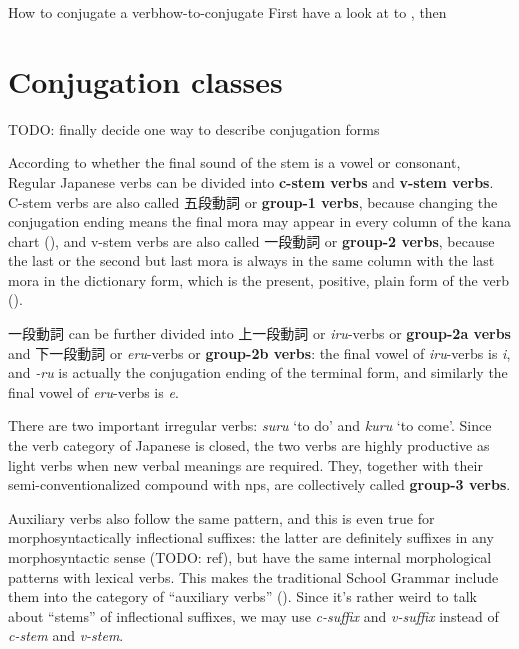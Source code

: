 \documentclass[UTF8, a4paper, oneside, scheme=plain]{ctexrep}
\newcommand*{\concept}[1]{\textbf{#1}}
\newcommand*{\term}[1]{\emph{#1}}
\newcommand{\corpus}[1]{\emph{#1}}
\newcommand{\translate}[1]{`#1'}
\begin{document}
\begin{learnbox}{How to conjugate a verb}{how-to-conjugate}
    First have a look at  to ,
    then 
\end{learnbox}

\section{Conjugation classes}\label{sec:conjugation-class}

TODO: finally decide one way to describe conjugation forms

According to whether the final sound of the stem is a vowel or consonant,
Regular Japanese verbs can be divided into \concept{c-stem verbs} and \concept{v-stem verbs}.
C-stem verbs are also called 五段動詞 or \concept{group-1 verbs},
because changing the conjugation ending means 
the final mora may appear in every column of the kana chart (), 
and v-stem verbs are also called 一段動詞 or \concept{group-2 verbs},
because the last or the second but last mora is always in the same column 
with the last mora in the dictionary form,
which is the present, positive, plain form of the verb ().

一段動詞 can be further divided into 上一段動詞 or \corpus{iru}-verbs or \concept{group-2a verbs} 
and 下一段動詞 or \corpus{eru}-verbs or \concept{group-2b verbs}:
the final vowel of \corpus{iru}-verbs is \corpus{i},
and \corpus{-ru} is actually the conjugation ending of the terminal form,
and similarly the final vowel of \corpus{eru}-verbs is \corpus{e}.

There are two important irregular verbs: \corpus{suru} \translate{to do} 
and \corpus{kuru} \translate{to come}.
Since the verb category of Japanese is closed,
the two verbs are highly productive as light verbs when new verbal meanings are required.
They, together with their semi-conventionalized compound with \ac{np}s,
are collectively called \concept{group-3 verbs}.

Auxiliary verbs also follow the same pattern,
and this is even true for morphosyntactically inflectional suffixes:
the latter are definitely suffixes in any morphosyntactic sense (TODO: ref),
but have the same internal morphological patterns with lexical verbs.
This makes the traditional School Grammar include them into the category of ``auxiliary verbs''
().
Since it's rather weird to talk about ``stems'' of inflectional suffixes,
we may use \term{c-suffix} and \term{v-suffix} instead of 
\term{c-stem} and \term{v-stem}.
\end{document}
